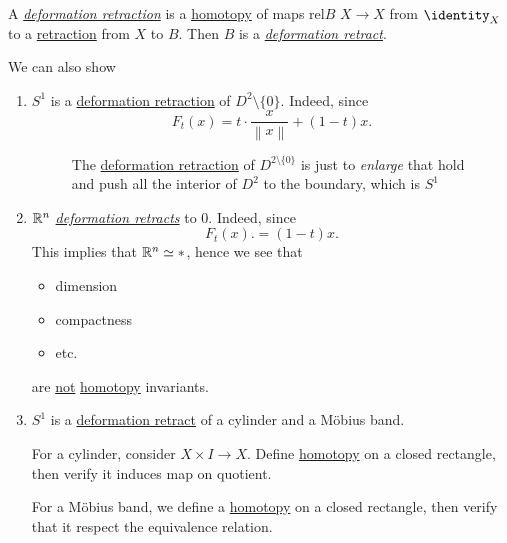 \begin{prev}
	A \hyperref[def:deformation-retraction]{\emph{deformation retraction}} is a \hyperref[def:homotopy]{homotopy}
	of maps \(\mathrm{rel} B\) \(X\to X\) from \(\identity_X\) to a \hyperref[def:retraction]{retraction} from \(X\) to \(B\). Then \(B\) is a
	\hyperref[def:deformation-retraction]{\emph{deformation retract}}.
\end{prev}
\begin{eg}
	We can also show
	\begin{enumerate}
		\item \(S^1\) is a \hyperref[def:deformation-retraction]{deformation retraction} of \(D^{2}\setminus \{0\}\). Indeed, since
		      \[
			      F_t(x) = t\cdot \frac{x}{\left\lVert x\right\rVert } + (1 - t)x.
		      \]
		      \begin{figure}[H]
			      \centering
			      \caption{The \hyperref[def:deformation-retraction]{deformation retraction} of \(D^{2\setminus \{0\}}\) is just to
				      \emph{enlarge} that hold and push all the interior of \(D^2\) to the boundary, which is \(S^1\)}
			      \label{fig:eg:punched-circle}
		      \end{figure}
		\item \(\mathbb{\MakeUppercase{R}} ^n\) \hyperref[def:deformation-retraction]{\emph{deformation retracts}} to \(0\). Indeed, since
		      \[
			      F_t(x). = (1 - t)x.
		      \]
		      This implies that \(\mathbb{\MakeUppercase{R}} ^n\simeq *\), hence we see that
		      \begin{itemize}
			      \item dimension
			      \item compactness
			      \item etc.
		      \end{itemize}
		      are \underline{not} \hyperref[def:homotopy]{homotopy} invariants.
		\item \(S^1\) is a \hyperref[def:deformation-retraction]{deformation retract} of a cylinder and a Möbius band.
		      \par For a cylinder, consider \(X\times I \to X\). Define \hyperref[def:homotopy]{homotopy} on a closed rectangle, then
		      verify it induces map on quotient.
		      \par For a Möbius band, we define a \hyperref[def:homotopy]{homotopy} on a closed rectangle, then verify
		      that it respect the equivalence relation.


\end{enumerate}
\end{eg}
